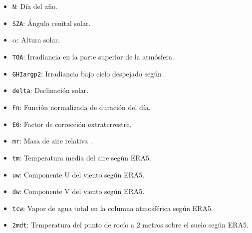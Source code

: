 \documentclass[letterpaper,12pt, twoside]{report}
\providecommand{\DIFdeltex}[1]{{\protect\color{red} \scriptsize #1}} %
\providecommand{\DIFdel}[1]{\texorpdfstring{\DIFdeltex{#1}}{}} %
\begin{document}
\begin{itemize}%
\item%
\DIFdel{\texttt{N}: Día del año.
}%
\item%
\DIFdel{\texttt{SZA}: Ángulo cenital solar.
}%
\item%
\DIFdel{\texttt{$\alpha$}: Altura solar.
}%
\item%
\DIFdel{\texttt{TOA}: Irradiancia en la parte superior de la atmósfera.
}%
\item%
\DIFdel{\texttt{GHIargp2}: Irradiancia bajo cielo despejado según \cite{Ledesma2023a}.
}%
\item%
\DIFdel{\texttt{delta}: Declinación solar.
}%
\item%
\DIFdel{\texttt{Fn}: Función normalizada de duración del día.
}%
\item%
\DIFdel{\texttt{E0}: Factor de corrección extraterrestre.
}%
\item%
\DIFdel{\texttt{mr}: Masa de aire relativa \cite{Gueymard2003}.
}%
\item%
\DIFdel{\texttt{tm}: Temperatura media del aire según ERA5.
}%
\item%
\DIFdel{\texttt{uw}: Componente U del viento según ERA5.
}%
\item%
\DIFdel{\texttt{dw}: Componente V del viento según ERA5.
}%
\item%
\DIFdel{\texttt{tcw}: Vapor de agua total en la columna atmosférica según ERA5.
}%
\item%
\DIFdel{\texttt{2mdt}: Temperatura del punto de rocío a 2 metros sobre el suelo según ERA5.
}%


\end{itemize}%
\end{document}
